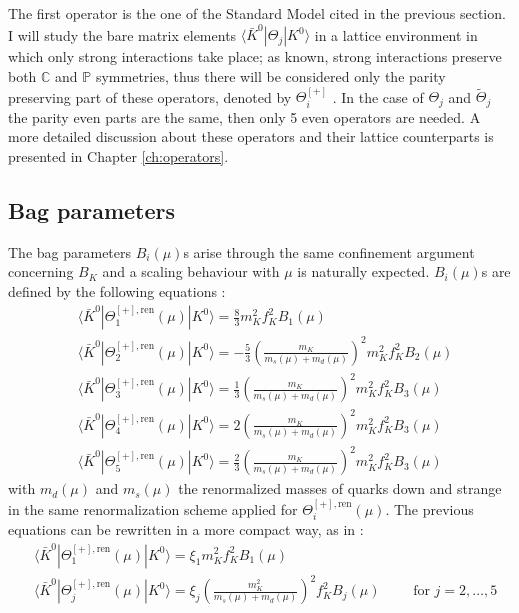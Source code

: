 \documentclass[english, LaM, oneside, noexaminfo]{sapthesis}
\newcommand{\la}{\langle}
\newcommand{\ra}{\rangle}
\newcommand{\ren}{{\text{ren}}}
\begin{document}
The first operator is the one of the Standard Model cited in the previous section.
I will study the bare matrix elements $\la \bar K^0 | \Theta_j | K^0 \ra$ in a lattice environment in which only strong interactions take place; as known, strong interactions preserve both $\mathbb{C}$ and $\mathbb{P}$ symmetries, thus there will be considered only the parity preserving part of these operators, denoted by $\Theta_i^{[+]}$ \cite{KMBSM}.
In the case of $\Theta_j$ and $\tilde\Theta_j$ the parity even parts are the same, then only 5 even operators are needed.
A more detailed discussion about these operators and their lattice counterparts is presented in Chapter \ref{ch:operators}.

\subsection{Bag parameters}
\noindent
The bag parameters $B_i(\mu)$s arise through the same confinement argument concerning $B_K$ and a scaling behaviour with $\mu$ is naturally expected.
$B_i(\mu)$s are defined by the following equations \cite{Bparameters}:
\begin{equation*}
    \begin{aligned}
        & \la \bar K^0 | \Theta_1^{[+],\ren}(\mu) | K^0 \ra = \frac{8}{3} m_K^2 f_K^2 B_1(\mu) \\
        & \la \bar K^0 | \Theta_2^{[+],\ren}(\mu) | K^0 \ra = -\frac{5}{3} \left(\frac{m_K}{m_s(\mu)+m_d(\mu)}\right)^2 m_K^2 f_K^2 B_2(\mu) \\
        & \la \bar K^0 | \Theta_3^{[+],\ren}(\mu) | K^0 \ra = \frac{1}{3} \left(\frac{m_K}{m_s(\mu)+m_d(\mu)}\right)^2 m_K^2 f_K^2 B_3(\mu) \\
        & \la \bar K^0 | \Theta_4^{[+],\ren}(\mu) | K^0 \ra = 2 \left(\frac{m_K}{m_s(\mu)+m_d(\mu)}\right)^2 m_K^2 f_K^2 B_3(\mu) \\
        & \la \bar K^0 | \Theta_5^{[+],\ren}(\mu) | K^0 \ra = \frac{2}{3} \left(\frac{m_K}{m_s(\mu)+m_d(\mu)}\right)^2 m_K^2 f_K^2 B_3(\mu)
    \end{aligned}
\end{equation*}
with $m_d (\mu)$ and $m_s (\mu)$ the renormalized masses of quarks down and strange in the same renormalization scheme applied for $\Theta_i^{[+],\ren}(\mu)$.
The previous equations can be rewritten in a more compact way, as in \cite{KMBSM}:
\begin{equation}\label{eq:bag-definition}
    \begin{aligned}
        & \la \bar K^0 | \Theta_1^{[+],\ren}(\mu) | K^0 \ra = \xi_1 m_K^2 f_K^2 B_1(\mu) \\
        & \la \bar K^0 | \Theta_j^{[+],\ren}(\mu) | K^0 \ra = \xi_j \left(\frac{m_K^2}{m_s(\mu)+m_d(\mu)}\right)^2 f_K^2 B_j(\mu) \quad \quad \text{ for } j=2,\dots,5
    \end{aligned}
\end{equation}
\end{document}
